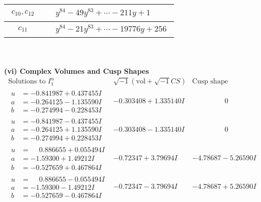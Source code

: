 \documentclass[1p]{elsarticle_modified}
\theoremstyle{definition}
\newcommand{\I}{\sqrt{-1}}
\begin{document}
\begin{tabular}{m{50pt}|m{274pt}}
\hline $$\begin{aligned}c_{10},c_{12}\end{aligned}$$&$\begin{aligned}
&y^{84}-49 y^{83}+\cdots-211 y+1
\end{aligned}$\\
\hline $$\begin{aligned}c_{11}\end{aligned}$$&$\begin{aligned}
&y^{84}-21 y^{83}+\cdots-19776 y+256
\end{aligned}$\\
\hline
\end{tabular}\\~\\
\newpage\flushleft \textbf{(vi) Complex Volumes and Cusp Shapes}
$$\begin{array}{c|c|c}  
\text{Solutions to }I^u_{1}& \I (\text{vol} + \sqrt{-1}CS) & \text{Cusp shape}\\
 \hline 
\begin{aligned}
u &= -0.841987 + 0.437455 I \\
a &= -0.264125 - 1.135590 I \\
b &= -0.274994 - 0.228453 I\end{aligned}
 & -0.303408 + 1.335140 I & \phantom{-0.000000 } 0 \\ \hline\begin{aligned}
u &= -0.841987 - 0.437455 I \\
a &= -0.264125 + 1.135590 I \\
b &= -0.274994 + 0.228453 I\end{aligned}
 & -0.303408 - 1.335140 I & \phantom{-0.000000 } 0 \\ \hline\begin{aligned}
u &= \phantom{-}0.886655 + 0.055494 I \\
a &= -1.59300 + 1.49212 I \\
b &= -0.527659 + 0.467864 I\end{aligned}
 & -0.72347 + 3.79694 I & -4.78687 - 5.26590 I \\ \hline\begin{aligned}
u &= \phantom{-}0.886655 - 0.055494 I \\
a &= -1.59300 - 1.49212 I \\
b &= -0.527659 - 0.467864 I\end{aligned}
 & -0.72347 - 3.79694 I & -4.78687 + 5.26590 I \\ \hline\begin{aligned}

\end{aligned}
\end{array}$$
\end{document}
